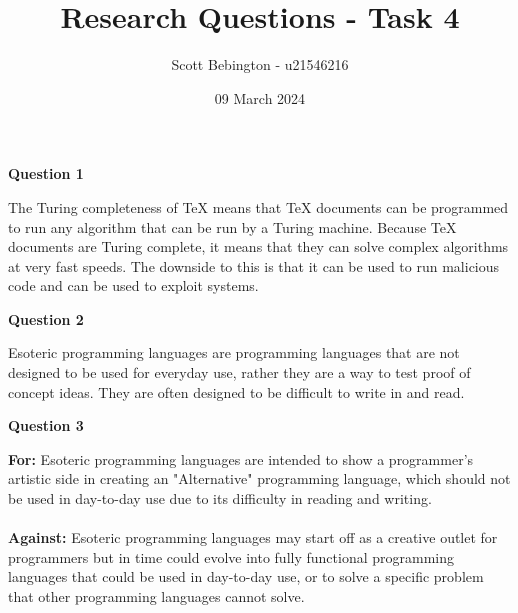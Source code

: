 \documentclass{article}
\title{Research Questions - Task 4}
\author{Scott Bebington - u21546216}
\date{09 March 2024}
\begin{document}
\maketitle


\begin{center}
    \large
    \textbf{Question 1}
    \normalsize
\end{center}
The Turing completeness of TeX means that TeX documents can be programmed to run any algorithm that can be run by a Turing machine.
Because TeX documents are Turing complete, it means that they can solve complex algorithms at very fast speeds.
The downside to this is that it can be used to run malicious code and can be used to exploit systems.\\


\begin{center}
    \large
    \textbf{Question 2}
    \normalsize
\end{center}
Esoteric programming languages are programming languages that are not designed to be used for everyday use, rather they are a way to test proof of concept ideas.
They are often designed to be difficult to write in and read.\\


\begin{center}
    \large
    \textbf{Question 3}
    \normalsize
\end{center}
\textbf{For:}
Esoteric programming languages are intended to show a programmer's artistic side in creating an "Alternative" programming language, which should not be used in day-to-day use due to its difficulty in reading and writing.\\\\
\textbf{Against:} \quad
Esoteric programming languages may start off as a creative outlet for programmers but in time could evolve into fully functional programming languages that could be used in day-to-day use, or to solve a specific problem that other programming languages cannot solve.\\
\end{document}
